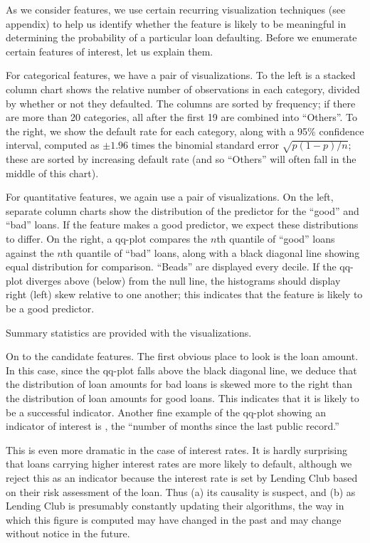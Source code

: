 As we consider features, we use certain recurring visualization techniques (see appendix) to help us identify whether the feature is likely to be meaningful in determining the probability of a particular loan defaulting. Before we enumerate certain features of interest, let us explain them.

For categorical features, we have a pair of visualizations. To the left is a stacked column chart shows the relative number of observations in each category, divided by whether or not they defaulted. The columns are sorted by frequency; if there are more than 20 categories, all after the first 19 are combined into ``Others''. To the right, we show the default rate for each category, along with a 95\% confidence interval, computed as $\pm 1.96$ times the binomial standard error $\sqrt{p(1-p)/n}$; these are sorted by increasing default rate (and so ``Others'' will often fall in the middle of this chart).

For quantitative features, we again use a pair of visualizations. On the left, separate column charts show the distribution of the predictor for the ``good'' and ``bad'' loans. If the feature makes a good predictor, we expect these distributions to differ. On the right, a qq-plot compares the $n$th quantile of ``good'' loans against the $n$th quantile of ``bad'' loans, along with a black diagonal line showing equal distribution for comparison. ``Beads'' are displayed every decile. If the qq-plot diverges above (below) from the null line, the histograms should display right (left) skew relative to one another; this indicates that the feature is likely to be a good predictor.

Summary statistics are provided with the visualizations.

On to the candidate features. The first obvious place to look is the loan amount. In this case, since the qq-plot falls above the black diagonal line, we deduce that the distribution of loan amounts for bad loans is skewed more to the right than the distribution of loan amounts for good loans. This indicates that it is likely to be a successful indicator. Another fine example of the qq-plot showing an indicator of interest is , the ``number of months since the last public record.''

This is even more dramatic in the case of interest rates. It is hardly surprising that loans carrying higher interest rates are more likely to default, although we reject this as an indicator because the interest rate is set by Lending Club based on their risk assessment of the loan. Thus (a) its causality is suspect, and (b) as Lending Club is presumably constantly updating their algorithms, the way in which this figure is computed may have changed in the past and may change without notice in the future.

